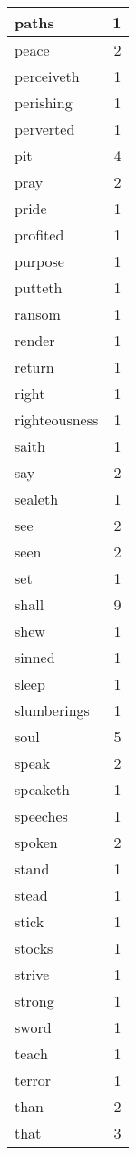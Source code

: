 \begin{center}
\begin{longtable}{l|r}
paths & 1 \\ \hline
peace & 2 \\ \hline
perceiveth & 1 \\ \hline
perishing & 1 \\ \hline
perverted & 1 \\ \hline
pit & 4 \\ \hline
pray & 2 \\ \hline
pride & 1 \\ \hline
profited & 1 \\ \hline
purpose & 1 \\ \hline
putteth & 1 \\ \hline
ransom & 1 \\ \hline
render & 1 \\ \hline
return & 1 \\ \hline
right & 1 \\ \hline
righteousness & 1 \\ \hline
saith & 1 \\ \hline
say & 2 \\ \hline
sealeth & 1 \\ \hline
see & 2 \\ \hline
seen & 2 \\ \hline
set & 1 \\ \hline
shall & 9 \\ \hline
shew & 1 \\ \hline
sinned & 1 \\ \hline
sleep & 1 \\ \hline
slumberings & 1 \\ \hline
soul & 5 \\ \hline
speak & 2 \\ \hline
speaketh & 1 \\ \hline
speeches & 1 \\ \hline
spoken & 2 \\ \hline
stand & 1 \\ \hline
stead & 1 \\ \hline
stick & 1 \\ \hline
stocks & 1 \\ \hline
strive & 1 \\ \hline
strong & 1 \\ \hline
sword & 1 \\ \hline
teach & 1 \\ \hline
terror & 1 \\ \hline
than & 2 \\ \hline
that & 3 \\ \hline

\end{longtable}
\end{center}
